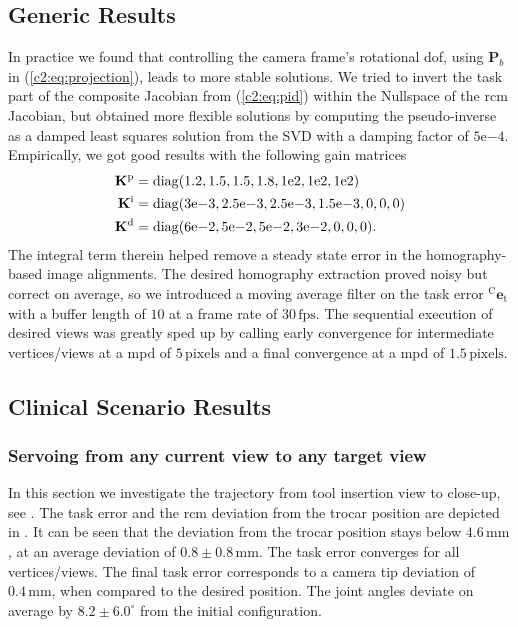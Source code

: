\subsection{Generic Results}
\label{c2:sec:generic_res}
In practice we found that controlling the camera frame's rotational \acrshort{dof}, using $\mathbf{P}_b$ in (\eqref{c2:eq:projection}), leads to more stable solutions. We tried to invert the task part of the composite Jacobian from (\eqref{c2:eq:pid}) within the Nullspace of the \acrshort{rcm} Jacobian, but obtained more flexible solutions by computing the pseudo-inverse as a damped least squares solution from the SVD with a damping factor of $5\mathrm{e}{-4}$. Empirically, we got good results with the following gain matrices
\begin{equation*}
    \begin{split}
        \mathbf{K}^\text{p} &= \operatorname{diag}(1.2, 1.5, 1.5, 1.8, 1\mathrm{e}{2}, 1\mathrm{e}{2}, 1\mathrm{e}{2}) \\
        \mathbf{K}^\text{i} &= \operatorname{diag}(3\mathrm{e}{-3}, 2.5\mathrm{e}{-3},2.5\mathrm{e}{-3}, 1.5\mathrm{e}{-3}, 0, 
    0, 0)\\
        \mathbf{K}^\text{d} &= \operatorname{diag}(6\mathrm{e}{-2}, 5\mathrm{e}{-2}, 5\mathrm{e}{-2}, 3\mathrm{e}{-2}, 0, 0, 0).
    \end{split}
\end{equation*}
The integral term therein helped remove a steady state error in the homography-based image alignments. The desired homography extraction proved noisy but correct on average, so we introduced a moving average filter on the task error $^\text{C}\mathbf{e}_\text{t}$ with a buffer length of $10$ at a frame rate of $30\,\text{fps}$. The sequential execution of desired views was greatly sped up by calling early convergence for intermediate vertices/views at a \acrshort{mpd} of $5\,\text{pixels}$ and a final convergence at a \acrshort{mpd} of $1.5\,\text{pixels}$. 

\subsection{Clinical Scenario Results}
\label{c2:sec:clin_res}
\subsubsection{Servoing from any current view to any target view}
\label{c2:sec:clin_res_any}

In this section we investigate the trajectory from tool insertion view to close-up, see . The task error and the \acrshort{rcm} deviation from the trocar position are depicted in . It can be seen that the deviation from the trocar position stays below $4.6\,\text{mm}$, at an average deviation of $0.8\pm0.8\,\text{mm}$. The task error converges for all vertices/views. The final task error corresponds to a camera tip deviation of $0.4\,\text{mm}$, when compared to the desired position. The joint angles deviate on average by $8.2\pm6.0^\circ$ from the initial configuration.

